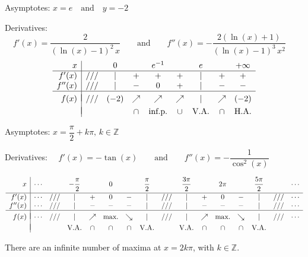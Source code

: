 \begin{Answer}
    
    	\Question Asymptotes: \quad $x=e\quad\mbox{and}\quad y=-2$\par
    		Derivatives: $\quad f'(x)=\dfrac{2}{(\ln (x)-1)^2\, x}\qquad\mbox{and}\qquad f''(x)=-\dfrac{2(\ln (x)+1)}{(\ln (x)-1)^3\, x^2}$
    		\[ \begin{array}{r|cccccccc}
    		x &  & 0 &  & e^{-1} &  & e & &+\infty \\
    		\hline
    		f'(x)   & /// & | & + & + & + & | & + & + \\
    		f''(x)  & /// & | & - & 0 & + & | & - & - \\
    		\hline
    		&&&&&&&&\vspace{-0.3cm}\\
    		f(x)    & /// & (-2) & \nearrow & \nearrow & \nearrow & | & \nearrow & (-2)\\
    		&&&&&&&&\vspace{-0.3cm}\\                                                                              
    		& & & \cap & \mbox{inf.p.} & \cup & \mbox{V.A.} & \cap & \mbox{H.A.}  \\
    		\end{array}\]
    		
    
    	\Question Asymptotes: \quad $x=\dfrac{\pi}{2}+k\pi,\, k\in\mathbb{Z}$\par
    		Derivatives: $\quad f'(x)=-\tan (x)\qquad\mbox{and}\qquad f''(x)=-\dfrac{1}{\cos^2 (x)}$
    		\begin{footnotesize}\[ \begin{array}{r|ccccccccccccccc}
    			x  & \cdots & & -\dfrac{\pi}{2} &  & 0 &  & \dfrac{\pi}{2} & & \dfrac{3\pi}{2} & & 2\pi & & \dfrac{5\pi}{2} & & \cdots  \\[0.2cm]
    			\hline
    			f'(x)    & \cdots & /// & | & + & 0 & - & | & /// & | & + & 0 & - & | & /// & \cdots  \\
    			f''(x)   & \cdots & /// & | & - & - & - & | & /// & | & - & - & - & | & /// & \cdots  \\
    			\hline
    			&&&&&&&&&&&&&&\vspace{-0.3cm}\\
    			f(x)     & \cdots & /// & | & \nearrow & \mbox{max.} & \searrow & | & /// & | & \nearrow & \mbox{max.} & \searrow & | & /// & \cdots \\
    			&&&&&&&&&&&&&&\vspace{-0.3cm}\\                                                                              
    			&  &  & \mbox{V.A.}  & \cap & \cap & \cap & \mbox{V.A.} &  & \mbox{V.A.} & \cap & \cap & \cap & \mbox{V.A.}  &  &    \\
    			\end{array}\]\end{footnotesize}
    		There are an infinite number of maxima at $x=2k\pi$, with $k\in\mathbb{Z}$.
    		

\end{Answer}
